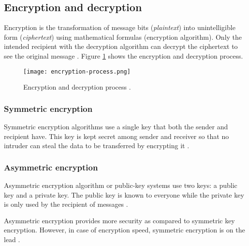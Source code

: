\subsection{Encryption and decryption}

Encryption is the transformation of message bits (\textit{plaintext}) into unintelligible form (\textit{ciphertext}) using mathematical formulas (encryption algorithm).
Only the intended recipient with the decryption algorithm can decrypt the ciphertext to see the original message \cite{Devi_2019}.
Figure \ref{fig:encryption-process.png} shows the encryption and decryption process.

\begin{figure}[!ht]
    \centering
    \texttt{[image: encryption-process.png]}
    \caption{Encryption and decryption process \cite{Bhanot_2015}.}
    \label{fig:encryption-process.png}
\end{figure}


\subsubsection{Symmetric encryption}

Symmetric encryption algorithms use a single key that both the sender and recipient have.
This key is kept secret among sender and receiver so that no intruder can steal the data to be transferred by encrypting it  \cite{Bhanot_2015}.


\subsubsection{Asymmetric encryption}

Asymmetric encryption algorithm or public-key systems use two keys: a public key and a private key.
The public key is known to everyone while the private key is only used by the recipient of messages \cite{Bhanot_2015}.

Asymmetric encryption provides more security as compared to symmetric key encryption.
However, in case of encryption speed, symmetric encryption is on the lead \cite{Bhanot_2015}.

